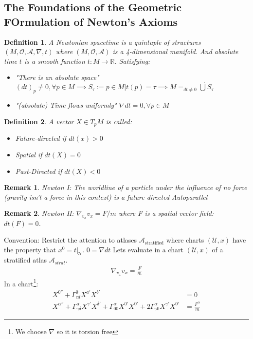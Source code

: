 \documentclass[10pt, oneside]{article}
\newcommand{\R}{\mathbb{R}}
\newtheorem{defn}{Definition}
\newtheorem{remark}{Remark}
\begin{document}
     \subsection{The Foundations of the Geometric FOrmulation of Newton's Axioms}
     \begin{defn}
     A Newtonian spacetime is a quintuple of structures $(M,\mathcal{O},\mathcal{A},\nabla,t)$ where $(M,\mathcal{O},\mathcal{A})$ is a 4-dimensional manifold. And absolute time $t$ is a smooth function $t:M \to \R$. Satisfying:
     \begin{itemize}
        \item "There is an absolute space" $(dt)_p \not = 0, \forall p \in M \implies S_\tau := {p \in M | t(p) = \tau} \implies M =_{dt\not = 0} \dot{\bigcup} S_\tau$
        \item "(absolute) Time flows uniformly" $\nabla dt = 0, \forall p \in M$
     \end{itemize}
     \end{defn}
     \begin{defn}
     A vector $X \in T_p M$ is called:
     \begin{itemize}
     \item Future-directed if $dt(x) > 0$
     \item Spatial if $dt(X) = 0$
     \item Past-Directed if $dt(X) < 0$
     \end{itemize}
     \end{defn}
     \begin{remark}
     Newton I: The worldline of a particle under the influence of no force (gravity isn't a force in this context) is a future-directed Autoparallel
     \end{remark}
     \begin{remark}
     Newton II: $\nabla_{v_{x}} v_x = F/m$ where F is a spatial vector field: $dt(F) = 0$.
     \end{remark}
     Convention: Restrict the attention to atlases $\mathcal{A}_{\text{stratified}}$ where charts $(\mathcal{U},x)$ have the property that $x^0 = t|_{\mathcal{U}}$. $0 = \nabla dt$
     Lets evaluate in a chart $(\mathcal{U},x)$ of a stratified atlas $\mathcal{A}_{strat}$.
     \begin{align*}
        \nabla_{v_{x}} v_{x} = \frac{F}{m}
     \end{align*}
     In a chart\footnote{We choose $\nabla$ so it is torsion free}:
     \begin{align*}
        X^{0''} + \Gamma^0_{cd} X^{a'} X^{b'} &= 0 \\
        X^{\alpha''} + \Gamma^\alpha_{\gamma \delta} X^{\gamma'} X^{\delta'} + \Gamma^\alpha_{00} X^{0'} X^{0'} + 2 \Gamma^\alpha_{\gamma 0} X^{\gamma'} X^{0'} & = \frac{F^\alpha}{m}
     \end{align*}
\end{document}
